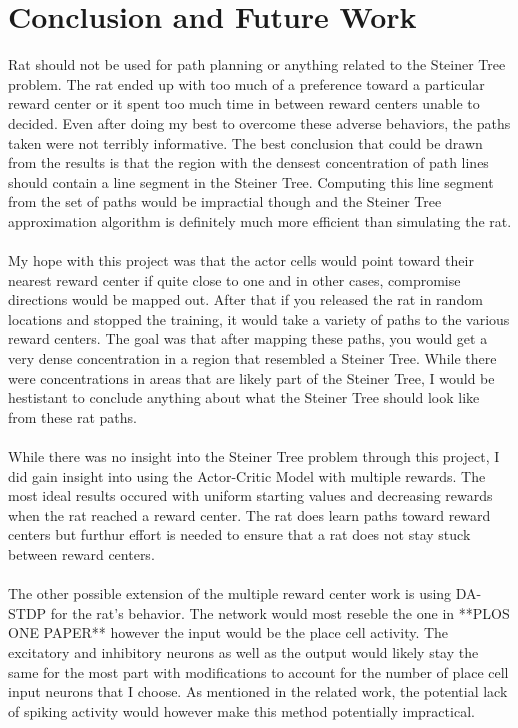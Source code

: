 \documentclass[conference]{IEEEtran}
\begin{document}
\section{Conclusion and Future Work}

Rat should not be used for path planning or anything related to the Steiner Tree problem. The rat ended up with too much of a preference toward a particular reward center or it spent too much time in between reward centers unable to decided. Even after doing my best to overcome these adverse behaviors, the paths taken were not terribly informative. The best conclusion that could be drawn from the results is that the region with the densest concentration of path lines should contain a line segment in the Steiner Tree. Computing this line segment from the set of paths would be impractial though and the Steiner Tree approximation algorithm is definitely much more efficient than simulating the rat. \\
\\
My hope with this project was that the actor cells would point toward their nearest reward center if quite close to one and in other cases, compromise directions would be mapped out. After that if you released the rat in random locations and stopped the training, it would take a variety of paths to the various reward centers. The goal was that after mapping these paths, you would get a very dense concentration in a region that resembled a Steiner Tree. While there were concentrations in areas that are likely part of the Steiner Tree, I would be hestistant to conclude anything about what the Steiner Tree should look like from these rat paths. \\
\\
While there was no insight into the Steiner Tree problem through this project, I did gain insight into using the Actor-Critic Model with multiple rewards. The most ideal results occured with uniform starting values and decreasing rewards when the rat reached a reward center. The rat does learn paths toward reward centers but furthur effort is needed to ensure that a rat does not stay stuck between reward centers. \\
\\
The other possible extension of the multiple reward center work is using DA-STDP for the rat's behavior. The network would most reseble the one in **PLOS ONE PAPER** however the input would be the place cell activity. The excitatory and inhibitory neurons as well as the output would likely stay the same for the most part with modifications to account for the number of place cell input neurons that I choose. As mentioned in the related work, the potential lack of spiking activity would however make this method potentially impractical.





\end{document}
